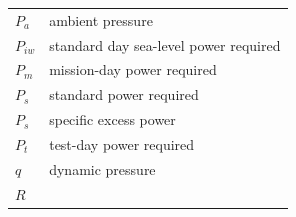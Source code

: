 \documentclass[
]{book}
\begin{document}
\begin{longtable}[]{@{}ll@{}}
\begin{minipage}[t]{0.14\columnwidth}
\(P_a\)\strut
\end{minipage} & \begin{minipage}[t]{0.80\columnwidth}\raggedright
ambient pressure\strut
\end{minipage}\tabularnewline
\begin{minipage}[t]{0.14\columnwidth}\raggedright
\(P_{iw}\)\strut
\end{minipage} & \begin{minipage}[t]{0.80\columnwidth}\raggedright
standard day sea-level power required\strut
\end{minipage}\tabularnewline
\begin{minipage}[t]{0.14\columnwidth}\raggedright
\(P_m\)\strut
\end{minipage} & \begin{minipage}[t]{0.80\columnwidth}\raggedright
mission-day power required\strut
\end{minipage}\tabularnewline
\begin{minipage}[t]{0.14\columnwidth}\raggedright
\(P_s\)\strut
\end{minipage} & \begin{minipage}[t]{0.80\columnwidth}\raggedright
standard power required\strut
\end{minipage}\tabularnewline
\begin{minipage}[t]{0.14\columnwidth}\raggedright
\(P_s\)\strut
\end{minipage} & \begin{minipage}[t]{0.80\columnwidth}\raggedright
specific excess power\strut
\end{minipage}\tabularnewline
\begin{minipage}[t]{0.14\columnwidth}\raggedright
\(P_t\)\strut
\end{minipage} & \begin{minipage}[t]{0.80\columnwidth}\raggedright
test-day power required\strut
\end{minipage}\tabularnewline
\begin{minipage}[t]{0.14\columnwidth}\raggedright
\(q\)\strut
\end{minipage} & \begin{minipage}[t]{0.80\columnwidth}\raggedright
dynamic pressure\strut
\end{minipage}\tabularnewline
\begin{minipage}[t]{0.14\columnwidth}\raggedright
\(R\)\strut
\end{minipage} & \begin{minipage}[t]{0.80\columnwidth}\raggedright

\end{minipage}
\end{longtable}
\end{document}
